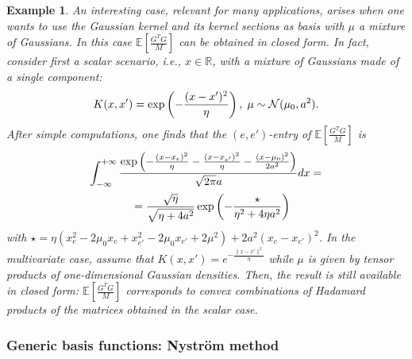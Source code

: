 \documentclass[10pt,twocolumn,twoside]{IEEEtran}					%
\newcounter{generalCounter}
\theoremstyle	{plain}
\newtheorem		{example}		[generalCounter]	{Example}
\newcommand{\Expectation}					[0]	{\mathbb{E}}
\newcommand{\ExpectationOf}					[1]	{\Expectation \left[ #1 \right]}
\begin{document}
\begin{example}
	An interesting case, relevant for many applications, arises when one wants to use the Gaussian kernel and its kernel sections as basis with $\mu$ a mixture of Gaussians. In this case $\ExpectationOf{\frac{G^{T} G}{M}}$ can be obtained in closed form. In fact, consider first a scalar scenario, i.e., $x\in\mathbb{R}$, with a mixture of Gaussians made of a single component:\vspace{0.2cm}
$$
	K(x,x') = \exp \left( -\frac{(x-x')^2}{\eta} \right),
	\;
	\mu \sim \mathcal{N}(\mu_0,a^2).
	\vspace{0.2cm}
$$
After simple computations, one finds that the $(e,e')$-entry of $\ExpectationOf{\frac{G^{T} G}{M}}$ is
\begin{equation}
	\begin{array}{l}
		\displaystyle
		\int_{-\infty}^{+\infty}
		\frac
		{\exp \left(
			-\frac{(x-x_e)^2}{\eta}
			-\frac{(x-x_{e'})^2}{\eta}
			-\frac{(x-\mu_0)^2}{2a^2}
		\right)}
		{\sqrt{2 \pi}a} dx =
		\vspace{0.2cm} \\
		\displaystyle
		\qquad\qquad =
		\frac{\sqrt{\eta}}{\sqrt{\eta+4a^2}}
		\exp \left( -\frac{\star}{\eta^2+4\eta a^2} \right)
	\end{array}
	\vspace{0.2cm}
\end{equation}
%
with $\star = \eta \left( x_e^2-2\mu_0 x_e+x_{e'}^2-2\mu_0 x_{e'}+2\mu^2 \right) + 2a^2 \left( x_e-x_{e'} \right)^2$. In the multivariate case, assume that $K(x,x') = e^{-\frac{\|x-x'\|^2}{\eta}}$ while $\mu$ is given by tensor products of one-dimensional Gaussian densities. Then, the result is still available in closed form: $\ExpectationOf{\frac{G^{T} G}{M}}$ corresponds to convex combinations of Hadamard products of the matrices obtained in the scalar case.
\end{example}

\subsubsection{Generic basis functions: Nystr{\"o}m method}
\label{sssec:application_of_the_distributed_tuning_algorithms_to_the_nystrom_method}
\end{document}
